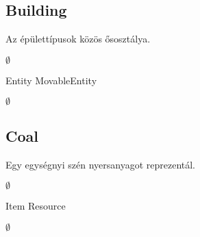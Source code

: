 \documentclass[../../projlab]{subfiles}
\begin{document}
\subsection{Building}
\begin{class-template-responsibility}
Az épülettípusok közös ősosztálya. 
\end{class-template-responsibility}
\begin{class-template-interface}
$\emptyset$
\end{class-template-interface}
\begin{class-template-baseclass}
Entity \baseclass MovableEntity
\end{class-template-baseclass}
\begin{class-template-attribute}
\item[] $\emptyset$
\end{class-template-attribute}
\begin{class-template-method}
\end{class-template-method}

\subsection{Coal}
\begin{class-template-responsibility}
 Egy egységnyi szén nyersanyagot reprezentál.
\end{class-template-responsibility}
\begin{class-template-interface}
$\emptyset$
\end{class-template-interface}
\begin{class-template-baseclass}
Item \baseclass Resource
\end{class-template-baseclass}
\begin{class-template-attribute}
\item[] $\emptyset$
\end{class-template-attribute}
\begin{class-template-method}
\end{class-template-method}
\end{document}
